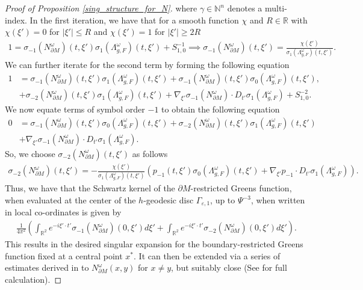 \documentclass[12pt,a4paper]{amsart}
\numberwithin{equation}{section}
\theoremstyle{plain}
\theoremstyle{definition}
\begin{document}
\begin{proof}[Proof of Proposition \ref{sing_structure_for_N}]
		where $\gamma\in\mathbb{N}^n$ denotes a multi-index. In the first iteration, we have that for a smooth function $\chi$ and $R\in \mathbb{R}$ with $\chi(\xi') = 0$ for $|\xi'| \leq R$ and $\chi(\xi')=1$ for $|\xi'|\geq 2R$
		\begin{align*}
			1 = \sigma_{-1}(N^\omega_{\partial M})(t,\xi')\sigma_1(\Lambda_{g,F}^\omega)(t,\xi') + S^{-1}_{1,0} \implies \sigma_{-1}(N^\omega_{\partial M})(t,\xi') = \frac{\chi(\xi')}{\sigma_1(\Lambda_{g,F}^\omega)(t,\xi')}.
		\end{align*}
		We can further iterate for the second term by forming the following equation
		\begin{align*}
			1 &= \sigma_{-1}(N^\omega_{\partial M})(t,\xi')\sigma_1(\Lambda_{g,F}^\omega)(t,\xi')+\sigma_{-1}(N^\omega_{\partial M})(t,\xi')\sigma_0(\Lambda_{g,F}^\omega)(t,\xi'),\\&+\sigma_{-2}(N^\omega_{\partial M})(t,\xi')\sigma_1(\Lambda_{g,F}^\omega)(t,\xi') +\nabla_{\xi'} \sigma_{-1}(N^\omega_{\partial M}) \cdot D_{t'} \sigma_1(\Lambda_{g,F}^\omega) + S^{-2}_{1,0}.
		\end{align*}
		We now equate terms of symbol order $-1$ to obtain the following equation
		\begin{align*}
			0 &= \sigma_{-1}(N^\omega_{\partial M})(t,\xi')\sigma_0(\Lambda_{g,F}^\omega)(t,\xi')+\sigma_{-2}(N^\omega_{\partial M})(t,\xi')\sigma_1(\Lambda_{g,F}^\omega)(t,\xi')\\&+\nabla_{\xi'} \sigma_{-1}(N^\omega_{\partial M}) \cdot D_{t'} \sigma_1(\Lambda_{g,F}^\omega).
		\end{align*}
		So, we choose $\sigma_{-2}(N^\omega_{\partial M})(t,\xi')$ as follows
		\begin{align*}
			\sigma_{-2}(N^\omega_{\partial M})(t,\xi') = -\frac{\chi(\xi')}{\sigma_1(\Lambda_{g,F}^\omega)(t,\xi')}\left(p_{-1}(t,\xi')\sigma_0(\Lambda_{g,F}^\omega)(t,\xi')+\nabla_{\xi'} p_{-1} \cdot D_{t'} \sigma_1(\Lambda_{g,F}^\omega)\right).
		\end{align*}
		Thus, we have that the Schwartz kernel of the $\partial M$-restricted Greens function, when evaluated at the center of the $h$-geodesic disc $\Gamma_{\varepsilon,1}$, up to $\Psi^{-3}$, when written in local co-ordinates is given by 
		\begin{align*}
			\frac{1}{4\pi^2}\left(\int_{\mathbb{R}^{2}}e^{-i\xi'\cdot t'}\sigma_{-1}(N^\omega_{\partial M})(0,\xi')d\xi' + \int_{\mathbb{R}^{2}}e^{-i\xi'\cdot t'}\sigma_{-2}(N^\omega_{\partial M})(0,\xi') d\xi'\right).
		\end{align*}
		This results in the desired singular expansion for the boundary-restricted Greens function fixed at a central point $x^*$. It can then be extended via a series of estimates derived in \cite{NursultanovTzouTzou} to \(N^\omega_{\partial M}(x,y)\) for \(x\neq y\), but suitably close (See \cite{NursultanovTradTzou} for full calculation).
\end{proof}
\end{document}
